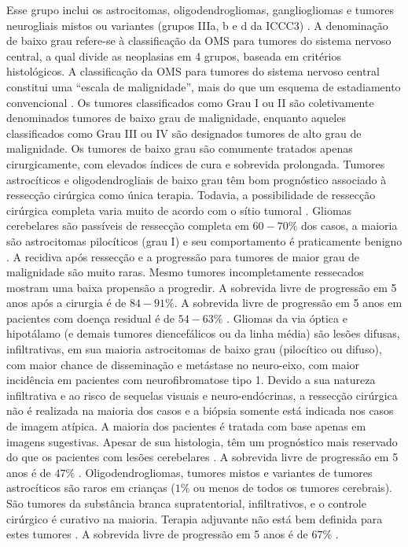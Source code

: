 \documentclass[11pt,a4paper,oldfontcommands]{memoir}
\begin{document}
Esse grupo inclui os astrocitomas, oligodendrogliomas, gangliogliomas e tumores neurogliais mistos ou variantes (grupos IIIa, b e d da ICCC3) \cite{CNCR20910}. A denominação de baixo grau refere-se à classificação da OMS para tumores do sistema nervoso central, a qual divide as neoplasias em 4 grupos, baseada em critérios histológicos. A classificação da OMS para tumores do sistema nervoso central constitui uma “escala de malignidade”, mais do que um esquema de estadiamento convencional \cite{louis}. Os tumores classificados como Grau I ou II são coletivamente denominados tumores de baixo grau de malignidade, enquanto aqueles classificados como Grau III ou IV são designados tumores de alto grau de malignidade. Os tumores de baixo grau são comumente tratados apenas cirurgicamente, com elevados índices de cura e sobrevida prolongada. Tumores astrocíticos e oligodendrogliais de baixo grau têm bom prognóstico associado à ressecção cirúrgica como única terapia. Todavia, a possibilidade de ressecção cirúrgica completa varia muito de acordo com o sítio tumoral \cite{wisof}.
Gliomas cerebelares são passíveis de ressecção completa em \(60-70\%\) dos casos, a maioria são astrocitomas pilocíticos (grau I) e seu comportamento é praticamente benigno \cite{gan}. A recidiva após ressecção e a progressão para tumores de maior grau de malignidade são muito raras. Mesmo tumores incompletamente ressecados mostram uma baixa propensão a progredir. A sobrevida livre de progressão em 5 anos após a cirurgia é de \(84-91\%\). A sobrevida livre de progressão em 5 anos em pacientes com doença residual é de \(54-63\%\) \cite{wisof}. Gliomas da via óptica e hipotálamo (e demais tumores diencefálicos ou da linha média) são lesões difusas, infiltrativas, em sua maioria astrocitomas de baixo grau (pilocítico ou difuso), com maior chance de disseminação e metástase no neuro-eixo, com maior incidência em pacientes com neurofibromatose tipo 1. Devido a sua natureza infiltrativa e ao risco de sequelas visuais e neuro-endócrinas, a ressecção cirúrgica não é realizada na maioria dos casos e a biópsia somente está indicada nos casos de imagem atípica. A maioria dos pacientes é tratada com base apenas em imagens sugestivas. Apesar de sua histologia, têm um prognóstico mais reservado do que os pacientes com lesões cerebelares \cite{gan}. A sobrevida livre de progressão em 5 anos é de \(47\%\) \cite{wisof}. Oligodendrogliomas, tumores mistos e variantes de tumores astrocíticos são raros em crianças (\(1\%\) ou menos de todos os tumores cerebrais). São tumores da substância branca supratentorial, infiltrativos, e o controle cirúrgico é curativo na maioria. Terapia adjuvante não está bem definida para estes tumores \cite{gan}. A sobrevida livre de progressão em 5 anos é de \(67\%\) \cite{wisof}.
\end{document}
